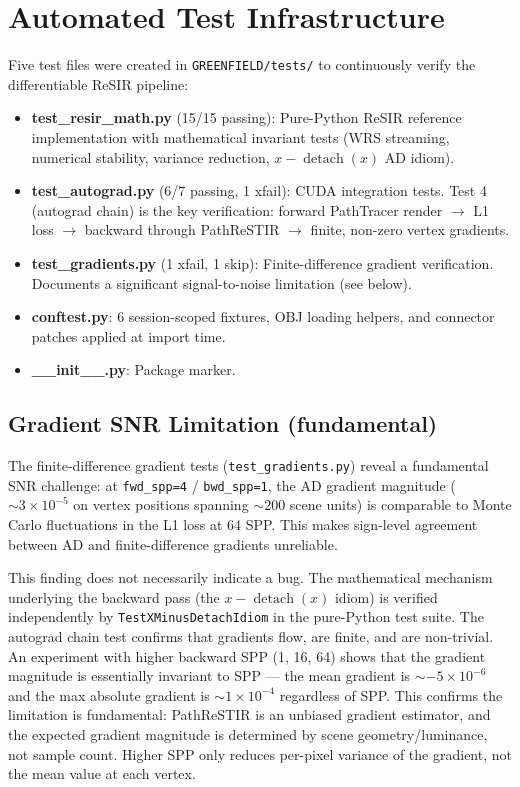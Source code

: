 \section{Automated Test Infrastructure}

Five test files were created in \texttt{GREENFIELD/tests/} to continuously
verify the differentiable ReSIR pipeline:

\begin{itemize}
    \item \textbf{test\_resir\_math.py} (15/15 passing): Pure-Python ReSIR
        reference implementation with mathematical invariant tests (WRS
        streaming, numerical stability, variance reduction, $x -
        \operatorname{detach}(x)$ AD idiom).
    \item \textbf{test\_autograd.py} (6/7 passing, 1 xfail): CUDA
        integration tests. Test 4 (autograd chain) is the key verification:
        forward PathTracer render $\to$ L1 loss $\to$ backward through
        PathReSTIR $\to$ finite, non-zero vertex gradients.
    \item \textbf{test\_gradients.py} (1 xfail, 1 skip): Finite-difference
        gradient verification. Documents a significant signal-to-noise
        limitation (see below).
    \item \textbf{conftest.py}: 6 session-scoped fixtures, OBJ loading
        helpers, and connector patches applied at import time.
    \item \textbf{\_\_init\_\_.py}: Package marker.
\end{itemize}

\subsection{Gradient SNR Limitation (fundamental)}

The finite-difference gradient tests (\texttt{test\_gradients.py}) reveal a
fundamental SNR challenge: at \texttt{fwd\_spp=4} / \texttt{bwd\_spp=1},
the AD gradient magnitude ($\sim 3 \times 10^{-5}$ on vertex positions
spanning $\sim 200$ scene units) is comparable to Monte Carlo fluctuations
in the L1 loss at 64 SPP. This makes sign-level agreement between AD and
finite-difference gradients unreliable.

This finding does not necessarily indicate a bug. The mathematical mechanism
underlying the backward pass (the $x - \operatorname{detach}(x)$ idiom) is
verified independently by \texttt{TestXMinusDetachIdiom} in the pure-Python
test suite. The autograd chain test confirms that gradients flow, are finite,
and are non-trivial. An experiment with higher backward SPP (1, 16, 64) shows
that the gradient magnitude is essentially invariant to SPP --- the mean
gradient is $\sim -5\times 10^{-6}$ and the max absolute gradient is
$\sim 1\times 10^{-4}$ regardless of SPP. This confirms the limitation is
fundamental: PathReSTIR is an unbiased gradient estimator, and the expected
gradient magnitude is determined by scene geometry/luminance, not sample
count. Higher SPP only reduces per-pixel variance of the gradient, not the
mean value at each vertex.

